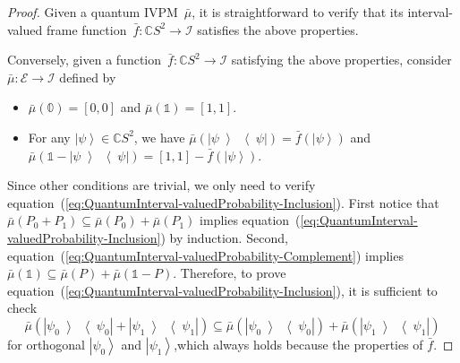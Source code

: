 \documentclass[12pt]{iopart}
\theoremstyle{plain}
\theoremstyle{definition}
\newcommand{\events}{\ensuremath{\mathcal{E}}}
\newcommand{\ket}[1]{{\left\vert{#1}\right\rangle}}
\newcommand{\op}[2]{\ensuremath{\left\vert{#1}\middle\rangle\middle\langle{#2}\right\vert}}
\newcommand{\proj}[1]{\op{#1}{#1}}
\begin{document}
\begin{proof} Given a quantum IVPM~$\bar{\mu}$, it is straightforward
to verify that its interval-valued frame function~$\bar{f}:\mathbb{C}S^{2}\rightarrow\mathscr{I}$
satisfies the above properties.

Conversely, given a function~$\bar{f}:\mathbb{C}S^{2}\rightarrow\mathscr{I}$
satisfying the above properties, consider $\bar{\mu}:\events\rightarrow\mathscr{I}$
defined by 
\begin{itemize}
\item $\bar{\mu}(\mathbb{0})=\left[0,0\right]$ and $\bar{\mu}(\mathbb{1})=\left[1,1\right]$. 
\item For any $\ket{\psi}\in\mathbb{C}S^{2}$, we have $\bar{\mu}\left(\proj{\psi}\right)=\bar{f}\left(\ket{\psi}\right)$
and $\bar{\mu}\left(\mathbb{1}-\proj{\psi}\right)=\left[1,1\right]-\bar{f}\left(\ket{\psi}\right)$. 
\end{itemize}
Since other conditions are trivial, we only need to verify equation~(\ref{eq:QuantumInterval-valuedProbability-Inclusion}).
First notice that $\bar{\mu}\left(P_{0}+P_{1}\right)\subseteq\bar{\mu}\left(P_{0}\right)+\bar{\mu}\left(P_{1}\right)$
implies equation~(\ref{eq:QuantumInterval-valuedProbability-Inclusion})
by induction. Second, equation~(\ref{eq:QuantumInterval-valuedProbability-Complement})
implies $\bar{\mu}\left(\mathbb{1}\right)\subseteq\bar{\mu}\left(P\right)+\bar{\mu}\left(\mathbb{1}-P\right)$.
Therefore, to prove equation~(\ref{eq:QuantumInterval-valuedProbability-Inclusion}),
it is sufficient to check 
\begin{equation}
\bar{\mu}\left(\proj{\psi_{0}}+\proj{\psi_{1}}\right)\subseteq\bar{\mu}\left(\proj{\psi_{0}}\right)+\bar{\mu}\left(\proj{\psi_{1}}\right)
\end{equation}
for orthogonal $\ket{\psi_{0}}$ and $\ket{\psi_{1}}$,which always
holds because the properties of $\bar{f}$.\end{proof}
\end{document}
